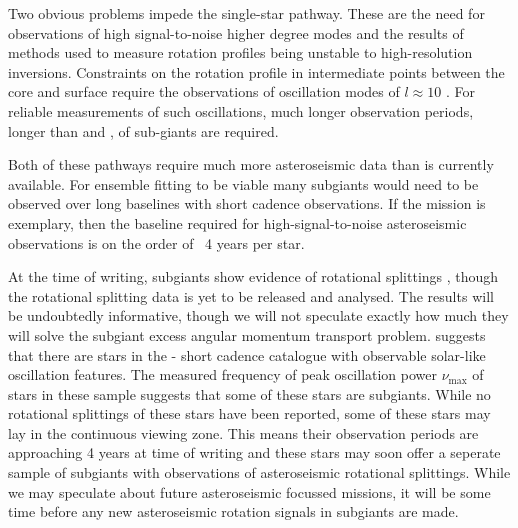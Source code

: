Two obvious problems impede the single-star pathway. 
These are the need for observations of high signal-to-noise higher degree modes and the results of methods used to measure rotation profiles being unstable to high-resolution inversions. 
Constraints on the rotation profile in intermediate points between the core and surface require the observations of oscillation modes of $l \approx 10$ \citep{ahlborn_asteroseismic_2020}. 
For reliable measurements of such oscillations, much longer observation periods, longer than \corot{} and \kepler{}, of sub-giants are required.
   
Both of these pathways require much more asteroseismic data than is currently available.
For ensemble fitting to be viable many subgiants would need to be observed over long baselines with short cadence observations.
If the \kepler{} mission is exemplary, then the baseline required for high-signal-to-noise asteroseismic observations is on the order of ~4 years per star.

At the time of writing,  subgiants show evidence of rotational splittings \citep{li_asteroseismology_2020,li_asteroseismology_2020-1}, though the rotational splitting data is yet to be released and analysed.
The results will be undoubtedly informative, though we will not speculate exactly how much they will solve the subgiant excess angular momentum transport problem.
\citet{hatt_catalogue_2023} suggests that there are  stars in the \tess{} - short cadence catalogue with observable solar-like oscillation features.
The measured frequency of peak oscillation power $\nu_{\text{max}}$ of stars in these sample suggests that some of these stars are subgiants.
While no rotational splittings of these stars have been reported, some of these stars may lay in the continuous viewing zone.
This means their observation periods are approaching 4 years at time of writing and these stars may soon offer a seperate sample of subgiants with observations of asteroseismic rotational splittings.
While we may speculate about future asteroseismic focussed missions, it will be some time before any new asteroseismic rotation signals in subgiants are made.


